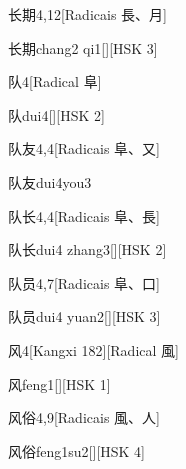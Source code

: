 \begin{entry}{长期}{4,12}[Radicais ⾧、⽉]
  \begin{phonetics}{长期}{chang2 qi1}[][HSK 3]
  \end{phonetics}
\end{entry}

\begin{entry}{队}{4}[Radical ⾩]
  \begin{phonetics}{队}{dui4}[][HSK 2]
  \end{phonetics}
\end{entry}

\begin{entry}{队友}{4,4}[Radicais ⾩、⼜]
  \begin{phonetics}{队友}{dui4you3}
  \end{phonetics}
\end{entry}

\begin{entry}{队长}{4,4}[Radicais ⾩、⾧]
  \begin{phonetics}{队长}{dui4 zhang3}[][HSK 2]
  \end{phonetics}
\end{entry}

\begin{entry}{队员}{4,7}[Radicais ⾩、⼝]
  \begin{phonetics}{队员}{dui4 yuan2}[][HSK 3]
  \end{phonetics}
\end{entry}

\begin{entry}{风}{4}[Kangxi 182][Radical ⾵]
  \begin{phonetics}{风}{feng1}[][HSK 1]
  \end{phonetics}
\end{entry}

\begin{entry}{风俗}{4,9}[Radicais ⾵、⼈]
  \begin{phonetics}{风俗}{feng1su2}[][HSK 4]
  \end{phonetics}
\end{entry}

